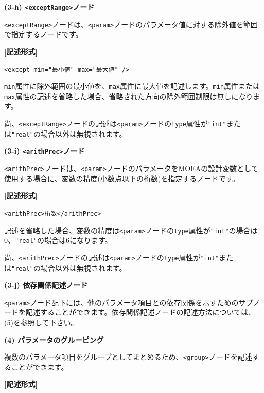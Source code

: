 \documentclass[a4paper,11pt]{jarticle}
\begin{document}
{\vspace{12pt}
\textbf{(3-h) \texttt{<exceptRange>}ノード}

\texttt{<exceptRange>}ノードは、\texttt{<param>}ノードのパラメータ値に対する除外値を範囲で指定するノードです。

\vspace{8pt}
\leftskip=12pt
\textbf{[記述形式]}

\leftskip=42pt
\texttt{<except  min="最小値"  max="最大値" />}

\vspace{8pt}
\leftskip=0pt
{\tt min}属性に除外範囲の最小値を、{\tt max}属性に最大値を記述します。{\tt min}属性または{\tt max}属性の記述を省略した場合、省略された方向の除外範囲制限は無しになります。

尚、\texttt{<exceptRange>}ノードの記述は\texttt{<param>}ノードの{\tt type}属性が\texttt{"int"}または\texttt{"real"}の場合以外は無視されます。

\vspace{12pt}
\textbf{(3-i) \texttt{<arithPrec>}ノード}

\texttt{<arithPrec>}ノードは、\texttt{<param>}ノードのパラメータをMOEAの設計変数として使用する場合に、変数の精度(小数点以下の桁数)を指定するノードです。

\vspace{8pt}
\leftskip=12pt
\textbf{[記述形式]}

\leftskip=42pt
\texttt{<arithPrec>桁数</arithPrec>}

\vspace{8pt}
\leftskip=0pt
記述を省略した場合、変数の精度は\texttt{<param>}ノードの{\tt type}属性が\texttt{"int"}の場合は0、\texttt{"real"}の場合は6になります。

尚、\texttt{<arithPrec>}ノードの記述は\texttt{<param>}ノードの{\tt type}属性が\texttt{"int"}または\texttt{"real"}の場合以外は無視されます。

\vspace{12pt}
\textbf{(3-j) 依存関係記述ノード}

\texttt{<param>}ノード配下には、他のパラメータ項目との依存関係を示すためのサブノードを記述することができます。依存関係記述ノードの記述方法については、(5)を参照して下さい。

\vspace{12pt}
\textbf{(4) パラメータのグルーピング}

複数のパラメータ項目をグループとしてまとめるため、\texttt{<group>}ノードを記述することができます。

\vspace{8pt}
\leftskip=12pt
\textbf{[記述形式]}

}
\end{document}
